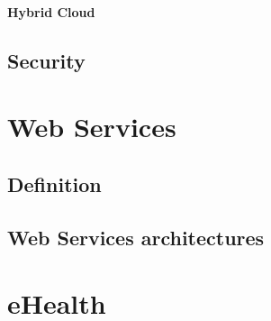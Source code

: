 \paragraph{Hybrid Cloud}
\subsection{Security}

\section{Web Services}
\subsection{Definition}
\subsection{Web Services architectures}





\section{eHealth}
